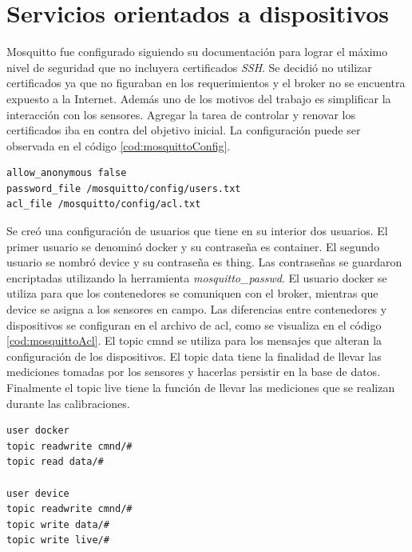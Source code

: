 
\section{Servicios orientados a dispositivos}

Mosquitto fue configurado siguiendo su documentación para lograr el máximo nivel de seguridad que no incluyera certificados \emph{SSH}.
Se decidió no utilizar certificados ya que no figuraban en los requerimientos y el broker no se encuentra expuesto a la Internet.
Además uno de los motivos del trabajo es simplificar la interacción con los sensores.
Agregar la tarea de controlar y renovar los certificados iba en contra del objetivo inicial.
La configuración puede ser observada en el código \ref{cod:mosquittoConfig}.

\begin{lstlisting}[label=cod:mosquittoConfig,caption=Archivo mosquitto.conf]
allow_anonymous false
password_file /mosquitto/config/users.txt
acl_file /mosquitto/config/acl.txt
\end{lstlisting}

Se creó una configuración de usuarios que tiene en su interior dos usuarios.
El primer usuario se denominó docker y su contraseña es container.
El segundo usuario se nombró device y su contraseña es thing.
Las contraseñas se guardaron encriptadas utilizando la herramienta \emph{mosquitto\_passwd}.
El usuario docker se utiliza para que los contenedores se comuniquen con el broker, mientras que device se asigna a los sensores en campo.
Las diferencias entre contenedores y dispositivos se configuran en el archivo de acl, como se visualiza en el código \ref{cod:mosquittoAcl}.
El topic cmnd se utiliza para los mensajes que alteran la configuración de los dispositivos.
El topic data tiene la finalidad de llevar las mediciones tomadas por los sensores y hacerlas persistir en la base de datos.
Finalmente el topic live tiene la función de llevar las mediciones que se realizan durante las calibraciones.

\begin{lstlisting}[label=cod:mosquittoAcl,caption=Lista de control de acceso]
user docker
topic readwrite cmnd/#
topic read data/#

user device
topic readwrite cmnd/#
topic write data/#
topic write live/#
\end{lstlisting}

